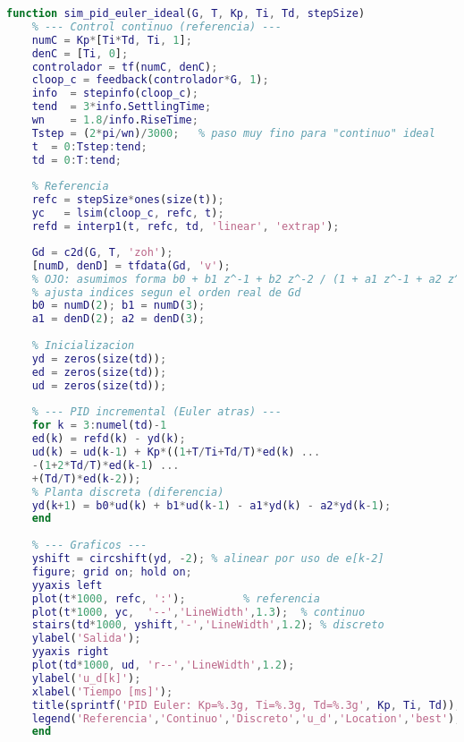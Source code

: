 \begin{strip}
	\vspace{-\baselineskip} %
	\noindent
	\begin{minipage}{0.98\textwidth}
\begin{lstlisting}[language=Matlab,style=matlabstyle]
	function sim_pid_euler_ideal(G, T, Kp, Ti, Td, stepSize)
	% --- Control continuo (referencia) ---
	numC = Kp*[Ti*Td, Ti, 1];
	denC = [Ti, 0];
	controlador = tf(numC, denC);
	cloop_c = feedback(controlador*G, 1);
	info  = stepinfo(cloop_c);
	tend  = 3*info.SettlingTime;
	wn    = 1.8/info.RiseTime;
	Tstep = (2*pi/wn)/3000;   % paso muy fino para "continuo" ideal
	t  = 0:Tstep:tend;
	td = 0:T:tend;
	
	% Referencia
	refc = stepSize*ones(size(t));
	yc   = lsim(cloop_c, refc, t);
	refd = interp1(t, refc, td, 'linear', 'extrap');

\end{lstlisting}

\end{minipage}
\vspace{-\baselineskip} %
\end{strip}




\begin{strip}
	\vspace{-\baselineskip} %
	\noindent
	\begin{minipage}{0.98\textwidth}
		\begin{lstlisting}[language=Matlab,style=matlabstyle, caption={Simulacion PID incremental (Euler) vs continuo}, label={lst:pid_euler_ideal}]
		% --- Planta discreta (ZOH) ---
	Gd = c2d(G, T, 'zoh');
	[numD, denD] = tfdata(Gd, 'v');
	% OJO: asumimos forma b0 + b1 z^-1 + b2 z^-2 / (1 + a1 z^-1 + a2 z^-2)
	% ajusta indices segun el orden real de Gd
	b0 = numD(2); b1 = numD(3);
	a1 = denD(2); a2 = denD(3);
	
	% Inicializacion
	yd = zeros(size(td));
	ed = zeros(size(td));
	ud = zeros(size(td));
	
	% --- PID incremental (Euler atras) ---
	for k = 3:numel(td)-1
	ed(k) = refd(k) - yd(k);
	ud(k) = ud(k-1) + Kp*((1+T/Ti+Td/T)*ed(k) ...
	-(1+2*Td/T)*ed(k-1) ...
	+(Td/T)*ed(k-2));
	% Planta discreta (diferencia)
	yd(k+1) = b0*ud(k) + b1*ud(k-1) - a1*yd(k) - a2*yd(k-1);
	end
	
	% --- Graficos ---
	yshift = circshift(yd, -2); % alinear por uso de e[k-2]
	figure; grid on; hold on;
	yyaxis left
	plot(t*1000, refc, ':');         % referencia
	plot(t*1000, yc,  '--','LineWidth',1.3);  % continuo
	stairs(td*1000, yshift,'-','LineWidth',1.2); % discreto
	ylabel('Salida');
	yyaxis right
	plot(td*1000, ud, 'r--','LineWidth',1.2);
	ylabel('u_d[k]');
	xlabel('Tiempo [ms]');
	title(sprintf('PID Euler: Kp=%.3g, Ti=%.3g, Td=%.3g', Kp, Ti, Td));
	legend('Referencia','Continuo','Discreto','u_d','Location','best');
	end
		\end{lstlisting}
		
	\end{minipage}
	\vspace{-\baselineskip} %
\end{strip}